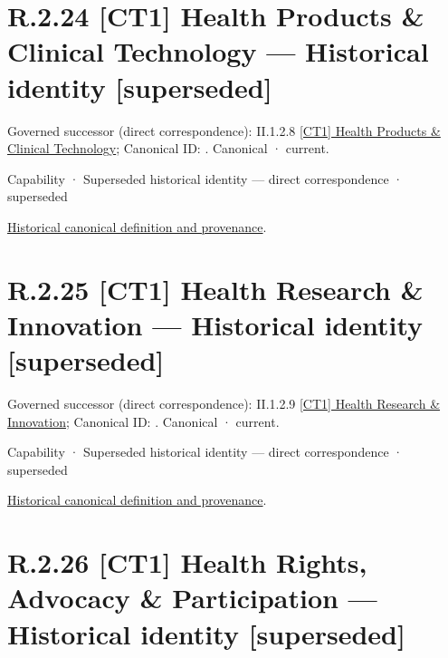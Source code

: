 \section*{R.2.24 [CT1] Health Products \& Clinical Technology — Historical identity [superseded]}
\label{navigation:R.2.24}

{\small Governed successor (direct correspondence): II.1.2.8 \hyperref[element:54388e3202c2403089b5c476c78c4567]{[CT1] Health Products \& Clinical Technology}; Canonical ID: \texttt{}. Canonical · current.}\par
\label{element:a631a8600b8b49df9ef452c48c91349a}
{\small Capability · Superseded historical identity — direct correspondence · superseded}\par
\href{../../../../continuum/strategy/capability/a631a8600b8b49df9ef452c48c91349a.md}{Historical canonical definition and provenance}.\par
\section*{R.2.25 [CT1] Health Research \& Innovation — Historical identity [superseded]}
\label{navigation:R.2.25}

{\small Governed successor (direct correspondence): II.1.2.9 \hyperref[element:582bf62145fd42118e5d57bb714841e8]{[CT1] Health Research \& Innovation}; Canonical ID: \texttt{}. Canonical · current.}\par
\label{element:2cc31384c8864c73989025cbe96dcfa7}
{\small Capability · Superseded historical identity — direct correspondence · superseded}\par
\href{../../../../continuum/strategy/capability/2cc31384c8864c73989025cbe96dcfa7.md}{Historical canonical definition and provenance}.\par
\section*{R.2.26 [CT1] Health Rights, Advocacy \& Participation — Historical identity [superseded]}
\label{navigation:R.2.26}

